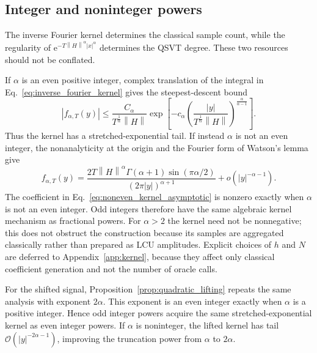 \documentclass[aps,pra,reprint,floatfix,unsortedaddress,superscriptaddress]{revtex4-2}
\newcommand{\norm}[1]{\left\lVert#1\right\rVert}
\newcommand{\abs}[1]{\left\lvert#1\right\rvert}
\newcommand{\Ocal}{\mathcal{O}}
\begin{document}
\subsection{Integer and noninteger powers}
\label{subsec:powers}

The inverse Fourier kernel determines the classical sample count,
while the regularity of
$\mathrm e^{-T\norm{H}^{\alpha}\abs{x}^{\alpha}}$ determines the QSVT
degree.  These two resources should not be conflated.

If $\alpha$ is an even positive integer, complex translation of the
integral in Eq.~\eqref{eq:inverse_fourier_kernel} gives the
steepest-descent bound
\begin{equation}
    \abs{f_{\alpha,T}(y)}
    \leq
    \frac{C_\alpha}{T^{\frac{1}{\alpha}}\norm{H}}
    \exp\!\left[
        -c_\alpha
        \left(
        \frac{\abs{y}}{T^{\frac{1}{\alpha}}\norm{H}}
        \right)^{\frac{\alpha}{\alpha-1}}
    \right].
    \label{eq:even_kernel_decay}
\end{equation}
Thus the kernel has a stretched-exponential tail.  If instead
$\alpha$ is not an even integer, the nonanalyticity at the origin and
the Fourier form of Watson's lemma give~\cite{wong2001asymptotic}
\begin{equation}
    f_{\alpha,T}(y)
    =
    \frac{
    2T\norm{H}^{\alpha}
    \Gamma(\alpha+1)\sin(\pi\alpha/2)}
    {(2\pi\abs{y})^{\alpha+1}}
    +
    o\!\left(\abs{y}^{-\alpha-1}\right).
    \label{eq:noneven_kernel_asymptotic}
\end{equation}
The coefficient in Eq.~\eqref{eq:noneven_kernel_asymptotic} is
nonzero exactly when $\alpha$ is not an even integer.  Odd integers
therefore have the same algebraic kernel mechanism as fractional
powers.  For $\alpha>2$ the kernel need not be nonnegative; this does
not obstruct the construction because its samples are aggregated
classically rather than prepared as LCU amplitudes.  Explicit choices
of $h$ and $N$ are deferred to
Appendix~\ref{app:kernel}, because they affect only classical
coefficient generation and not the number of oracle calls.

For the shifted signal, Proposition~\ref{prop:quadratic_lifting}
repeats the same analysis with exponent $2\alpha$.  This exponent is
an even integer exactly when $\alpha$ is a positive integer.  Hence
odd integer powers acquire the same stretched-exponential kernel as
even integer powers.  If $\alpha$ is noninteger, the lifted kernel has
tail $\Ocal(\abs{y}^{-2\alpha-1})$, improving the truncation
power from $\alpha$ to $2\alpha$.
\end{document}
